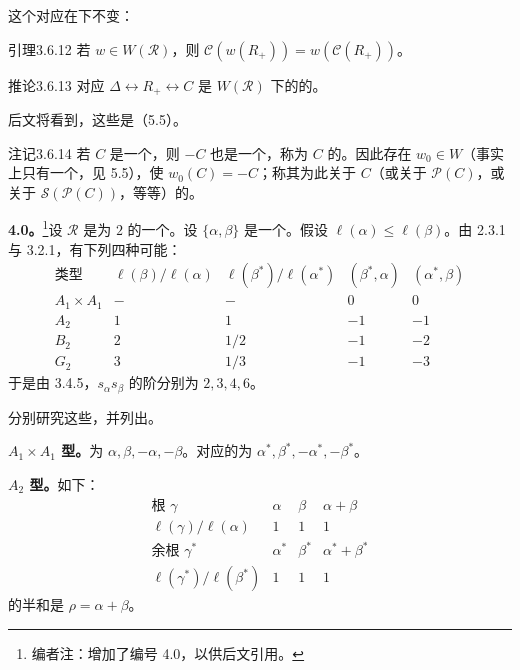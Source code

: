 这个对应在下不变：
\begin{SGAresult}{引理}{3.6.12}
若 $w\in W(\mathscr R)$，则 $\mathscr C(w(R_+))=w(\mathscr C(R_+))$。
\end{SGAresult}
\begin{SGAresult}{推论}{3.6.13}
对应 $\Delta\leftrightarrow R_+\leftrightarrow C$ 是 $W(\mathscr R)$ 下的的。
\end{SGAresult}
后文将看到，这些是（5.5）。
\begin{SGAresult}{注记}{3.6.14}
若 $C$ 是一个，则 $-C$ 也是一个，称为 $C$ 的。因此存在 $w_0\in W$（事实上只有一个，见 5.5），使 $w_0(C)=-C$；称其为此关于 $C$（或关于 $\mathscr P(C)$，或关于 $\mathscr S(\mathscr P(C))$，等等）的。
\end{SGAresult}

\textbf{4.0。}\footnote{编者注：增加了编号 4.0，以供后文引用。}设 $\mathscr R$ 是为 $2$ 的一个。设 $\{\alpha,\beta\}$ 是一个。假设 $\ell(\alpha)\leq\ell(\beta)$。由 2.3.1 与 3.2.1，有下列四种可能：
\[
\begin{array}{c|cccc}
\text{类型}&\ell(\beta)/\ell(\alpha)&\ell(\beta^*)/\ell(\alpha^*)&(\beta^*,\alpha)&(\alpha^*,\beta)\\\hline
A_1\times A_1&-&-&0&0\\
A_2&1&1&-1&-1\\
B_2&2&1/2&-1&-2\\
G_2&3&1/3&-1&-3
\end{array}
\]
于是由 3.4.5，$s_\alpha s_\beta$ 的阶分别为 $2,3,4,6$。

分别研究这些，并列出。

\textbf{$A_1\times A_1$ 型。}为 $\alpha,\beta,-\alpha,-\beta$。对应的为 $\alpha^*,\beta^*,-\alpha^*,-\beta^*$。

\textbf{$A_2$ 型。}如下：
\[
\begin{array}{c|ccc}
\text{根 }\gamma&\alpha&\beta&\alpha+\beta\\\hline
\ell(\gamma)/\ell(\alpha)&1&1&1\\\hline
\text{余根 }\gamma^*&\alpha^*&\beta^*&\alpha^*+\beta^*\\\hline
\ell(\gamma^*)/\ell(\beta^*)&1&1&1
\end{array}
\]
的半和是 $\rho=\alpha+\beta$。

